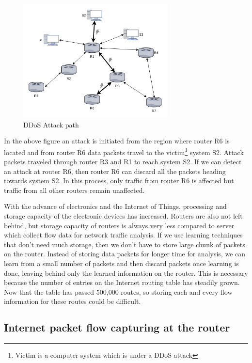 \documentclass[12pt,oneside,a4paper]{article}
\begin{document}
\begin{figure}[H]
\centering
\includegraphics[width=0.70\textwidth]{attack_path.png}
\caption{DDoS Attack path} \label{fig:attackpath}
\end{figure}


In the above figure an attack is initiated from the region where router R6 is located and from router R6 data packets travel to the victim\footnote{Victim is a computer system which is under a DDoS attack} system S2. Attack packets traveled through router R3 and R1 to reach system S2. If we can detect an attack at router R6, then router R6 can discard all the packets heading towards system S2. In this process, only traffic from router R6 is affected but traffic from all other routers remain unaffected.

With the advance of electronics and the Internet of Things, processing and storage capacity of the electronic devices has increased. Routers are also not left behind, but storage capacity of routers is always very less compared to server which collect flow data for network traffic analysis. If we use learning techniques that don't need much storage, then we don't have to store large chunk of packets on the router. Instead of storing data packets for longer time for analysis, we can learn from a small number of packets and then discard packets once learning is done, leaving behind only the learned information on the router. This is necessary because the number of entries on the Internet routing table has steadily grown. Now that the table has passed 500,000 routes\cite{routing-tablesize}, so storing each and every flow information for these routes could be difficult.\par

\subsection{Internet packet flow capturing at the router}
\end{document}
